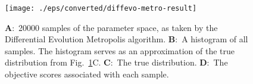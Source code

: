 
\begin{figure}[htbp]
  \centering
    \texttt{[image: ./eps/converted/diffevo-metro-result]}
    \caption{\textbf{A}:~20000 samples of the parameter space, as taken by the
    Differential Evolution Metropolis algorithm. \textbf{B}:~A histogram of all
    samples. The histogram serves as an approximation of the true distribution
    from Fig.~\ref{fig:diffevo-metro-result}C. \textbf{C}:~The true
    distribution. \textbf{D}:~The objective scores associated with each sample.}
  \label{fig:diffevo-metro-result}
\end{figure}

